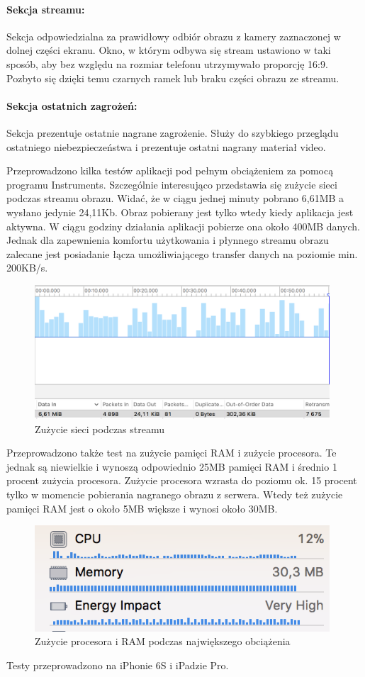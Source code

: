 \paragraph{Sekcja streamu:}
Sekcja odpowiedzialna za prawidłowy odbiór obrazu z kamery zaznaczonej w dolnej części ekranu. Okno, w którym odbywa się stream ustawiono w taki sposób, aby bez względu na rozmiar telefonu utrzymywało proporcję 16:9. Pozbyto się dzięki temu czarnych ramek lub braku części obrazu ze streamu.
\paragraph{Sekcja ostatnich zagrożeń:}
Sekcja prezentuje ostatnie nagrane zagrożenie. Służy do szybkiego przeglądu ostatniego niebezpieczeństwa i prezentuje ostatni nagrany materiał video. 

Przeprowadzono kilka testów aplikacji pod pełnym obciążeniem za pomocą programu Instruments. Szczególnie interesująco przedstawia się zużycie sieci podczas streamu obrazu. Widać, że w ciągu jednej minuty pobrano 6,61MB a wysłano jedynie 24,11Kb. Obraz pobierany jest tylko wtedy kiedy aplikacja jest aktywna. W ciągu godziny działania aplikacji pobierze ona około 400MB danych. Jednak dla zapewnienia komfortu użytkowania i płynnego streamu obrazu zalecane jest posiadanie łącza umożliwiającego transfer danych na poziomie min. 200KB/s. 
\begin{figure}[h]
	\centering
	\includegraphics[width=11cm]{networkUsage}
	\caption{Zużycie sieci podczas streamu}
\end{figure}
Przeprowadzono także test na zużycie pamięci RAM i zużycie procesora. Te jednak są niewielkie i wynoszą odpowiednio 25MB pamięci RAM i średnio 1 procent zużycia procesora.
Zużycie procesora wzrasta do poziomu ok. 15 procent tylko w momencie pobierania nagranego obrazu z serwera. Wtedy też zużycie pamięci RAM jest o około 5MB większe i wynosi około 30MB.
\begin{figure}[h]
	\centering
	\includegraphics[width=11cm]{CPURAM}
	\caption{Zużycie procesora i RAM podczas największego obciążenia}
\end{figure}
Testy przeprowadzono na iPhonie 6S i iPadzie Pro.




